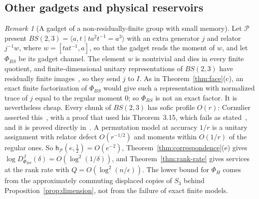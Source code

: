 \documentclass[11pt,a4paper]{article}
\theoremstyle{plain}
\theoremstyle{definition}
\theoremstyle{remark}
\newtheorem{remark}[theorem]{Remark}
\newcommand{\DChoi}{D^{J}}
\begin{document}
\subsection{Other gadgets and physical reservoirs}\label{sec:other-gadgets}

\begin{remark}[A gadget of a non-residually-finite group with small memory]\label{rem:bs}
Let $\mathcal P$ present $BS(2,3)=\langle a,t\mid ta^2t^{-1}=a^3\rangle$ with an extra generator $j$ and relator $j^{-1}w$, where $w=[tat^{-1},a]$, so
that the gadget reads the moment of $w$, and let $\Phi_{BS}$ be its gadget channel. The element $w$ is nontrivial and dies in every finite quotient,
and finite-dimensional unitary representations of $BS(2,3)$ have residually finite images~\cite{Malcev1940}, so they send $j$ to $I$. As in
Theorem~\ref{thm:face}(c), an exact finite factorization of $\Phi_{BS}$ would give such a representation with normalized trace of $j$ equal to the
regular moment $0$; so $\Phi_{BS}$ is not an exact factor. It is nevertheless cheap. Every chunk of $BS(2,3)$ has sofic profile
$O(r)$: Cornulier asserted this~\cite[Proposition~3.17]{Cornulier2013}, with a proof that used his Theorem~3.15, which fails as
stated~\cite[Section~7]{DouglasMghirbiA}, and it is proved directly in~\cite[Theorem~8.3(a)]{DouglasMghirbiA}. A permutation model at accuracy $1/r$ is a unitary assignment with relator defect $O(r^{-1/2})$ and
moments within $O(1/r)$ of the regular ones. So $\mathsf h_{\mathcal P}(e,\frac12)=O(e^{-2})$, Theorem~\ref{thm:correspondence}(e) gives
$\log\DChoi_{\Phi_{BS}}(\delta)=O(\log^2(1/\delta))$, and Theorem~\ref{thm:rank-rate} gives services at the rank rate with $Q=O(\log^2(n/\epsilon))$.
The lower bound for $\Phi_H$ comes from the approximately commuting displaced copies of $S_3$ behind
Proposition~\ref{prop:dimension}, not from the failure of exact finite models.
\end{remark}
\end{document}
